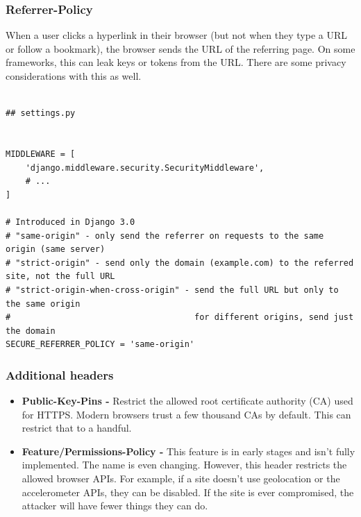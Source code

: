 \documentclass[handout]{beamer}
\begin{document}
\begin{frame}[fragile]
\frametitle{Referrer-Policy}
{\tiny

When a user clicks a hyperlink in their browser (but not when they type a URL or follow a bookmark),
the browser sends the URL of the referring page.
On some frameworks, this can leak keys or tokens from the URL.
There are some privacy considerations with this as well.

\vfill

\begin{verbatim}

## settings.py


MIDDLEWARE = [
    'django.middleware.security.SecurityMiddleware',
    # ...
]

# Introduced in Django 3.0
# "same-origin" - only send the referrer on requests to the same origin (same server)
# "strict-origin" - send only the domain (example.com) to the referred site, not the full URL
# "strict-origin-when-cross-origin" - send the full URL but only to the same origin
#                                     for different origins, send just the domain
SECURE_REFERRER_POLICY = 'same-origin'

\end{verbatim}
}
\end{frame}


\begin{frame}
  \frametitle{Additional headers}
  \begin{itemize}
    \item \textbf{Public-Key-Pins - } Restrict the allowed root certificate authority (CA) used for HTTPS. Modern browsers trust a few thousand CAs by default. This can restrict that to a handful.
    \item \textbf{Feature/Permissions-Policy - } This feature is in early stages and isn't fully implemented. The name is even changing. However, this header restricts the allowed browser APIs. For example, if a site doesn't use geolocation or the accelerometer APIs, they can be disabled. If the site is ever compromised, the attacker will have fewer things they can do.
  \end{itemize}
\end{frame}
\end{document}
